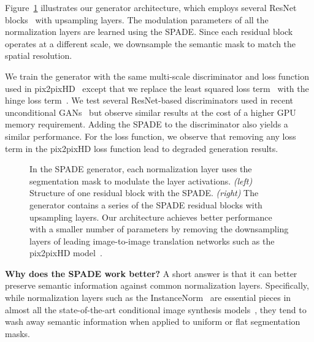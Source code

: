 Figure~\ref{fig::architecture} illustrates our generator architecture, which employs several ResNet blocks~\cite{he2016deep} with upsampling layers. The modulation parameters of all the normalization layers are learned using the SPADE. Since each residual block operates at a different scale, we downsample the semantic mask to match the spatial resolution.

We train the generator with the same multi-scale discriminator and loss function used in pix2pixHD~\cite{wang2018pix2pixHD} except that we replace the least squared loss term~\cite{mao2017least} with the hinge loss term~\cite{lim2017geometric,miyato2018spectral,zhang2018self}. We test several ResNet-based discriminators used in recent unconditional GANs~\cite{arjovsky2017wasserstein,mescheder2018training,miyato2018cgans} but observe similar results at the cost of a higher GPU memory requirement. Adding the SPADE to the discriminator also yields a similar performance. For the loss function, we observe that removing any loss term in the pix2pixHD loss function lead to degraded generation results.

\begin{figure}
 \centering

  \caption{In the SPADE generator, each normalization layer uses the segmentation mask to modulate the layer activations.\textit{ (left)} Structure of one residual block with the SPADE. \textit{(right) }The generator contains a series of the SPADE residual blocks with upsampling layers. Our architecture achieves better performance with a smaller number of parameters by removing the downsampling layers of leading image-to-image translation networks such as the pix2pixHD model~\cite{wang2018pix2pixHD}. }
 \label{fig::architecture}

\end{figure}

{\bf Why does the SPADE work better?} A short answer is that it can better preserve semantic information against common normalization layers. Specifically, while normalization layers such as the InstanceNorm~\cite{ulyanov1607instance} are essential pieces in almost all the state-of-the-art conditional image synthesis models~\cite{wang2018pix2pixHD}, they tend to wash away semantic information when applied to uniform or flat segmentation masks.

